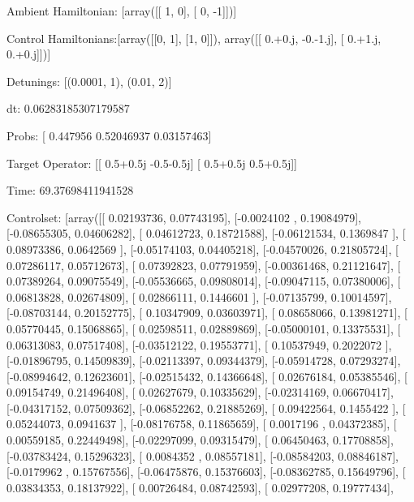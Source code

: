 \documentclass{article}
\begin{document}
    

\newpage

Ambient Hamiltonian: [array([[ 1,  0],
       [ 0, -1]])]

Control Hamiltonians:[array([[0, 1],
       [1, 0]]), array([[ 0.+0.j, -0.-1.j],
       [ 0.+1.j,  0.+0.j]])]

Detunings: [(0.0001, 1), (0.01, 2)]

 dt: 0.06283185307179587

Probs: [ 0.447956    0.52046937  0.03157463]

Target Operator: [[ 0.5+0.5j -0.5-0.5j]
 [ 0.5+0.5j  0.5+0.5j]]

Time: 69.37698411941528

Controlset: [array([[ 0.02193736,  0.07743195],
       [-0.0024102 ,  0.19084979],
       [-0.08655305,  0.04606282],
       [ 0.04612723,  0.18721588],
       [-0.06121534,  0.1369847 ],
       [ 0.08973386,  0.0642569 ],
       [-0.05174103,  0.04405218],
       [-0.04570026,  0.21805724],
       [ 0.07286117,  0.05712673],
       [ 0.07392823,  0.07791959],
       [-0.00361468,  0.21121647],
       [ 0.07389264,  0.09075549],
       [-0.05536665,  0.09808014],
       [-0.09047115,  0.07380006],
       [ 0.06813828,  0.02674809],
       [ 0.02866111,  0.1446601 ],
       [-0.07135799,  0.10014597],
       [-0.08703144,  0.20152775],
       [ 0.10347909,  0.03603971],
       [ 0.08658066,  0.13981271],
       [ 0.05770445,  0.15068865],
       [ 0.02598511,  0.02889869],
       [-0.05000101,  0.13375531],
       [ 0.06313083,  0.07517408],
       [-0.03512122,  0.19553771],
       [ 0.10537949,  0.2022072 ],
       [-0.01896795,  0.14509839],
       [-0.02113397,  0.09344379],
       [-0.05914728,  0.07293274],
       [-0.08994642,  0.12623601],
       [-0.02515432,  0.14366648],
       [ 0.02676184,  0.05385546],
       [ 0.09154749,  0.21496408],
       [ 0.02627679,  0.10335629],
       [-0.02314169,  0.06670417],
       [-0.04317152,  0.07509362],
       [-0.06852262,  0.21885269],
       [ 0.09422564,  0.1455422 ],
       [ 0.05244073,  0.0941637 ],
       [-0.08176758,  0.11865659],
       [ 0.0017196 ,  0.04372385],
       [ 0.00559185,  0.22449498],
       [-0.02297099,  0.09315479],
       [ 0.06450463,  0.17708858],
       [-0.03783424,  0.15296323],
       [ 0.0084352 ,  0.08557181],
       [-0.08584203,  0.08846187],
       [-0.0179962 ,  0.15767556],
       [-0.06475876,  0.15376603],
       [-0.08362785,  0.15649796],
       [ 0.03834353,  0.18137922],
       [ 0.00726484,  0.08742593],
       [ 0.02977208,  0.19777434],
\end{document}
